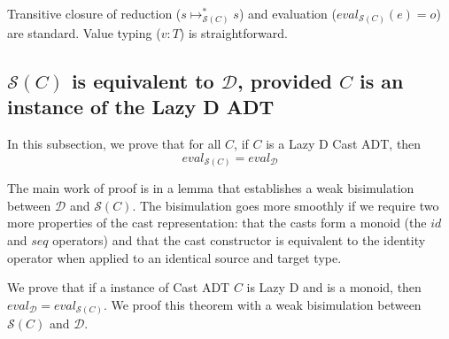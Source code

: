 \documentclass[acmsmall,review,anonymous]{acmart}\settopmatter{printfolios=true,printccs=false,printacmref=false}
\newcommand{\judgeType}[2]{#1 : #2}
\newcommand{\hckOOconsI}[3]{\mathtt{cons_1}\;#1\;#2\;#3}
\newcommand{\judgeSreduceTrans}[3]{#2 \longmapsto_{\mathcal{S}(#1)}^{*} #3}
\newcommand{\judgeSeval}[3]{eval_{\mathcal{S}(#1)}(#2) = #3}
\newcommand{\ineffCEKD}{$\mathcal{D}$}
\newcommand{\effCEK}[1]{$\mathcal{S}(#1)$}
\newcommand{\evalEqv}[2]{\ensuremath{eval_{\text{#1}} = eval_{\text{#2}}}}
\begin{document}

Transitive closure of reduction ($\judgeSreduceTrans{C}{s}{s}$) and 
evaluation ($\judgeSeval{C}{e}{o}$) are standard. Value typing 
($\judgeType{v}{T}$) is straightforward.

\subsection{\effCEK{C} is equivalent to \ineffCEKD, provided $C$ is an instance of the Lazy D ADT}
\label{secc:framework:monoid-correct}

In this subsection, we prove that for all $C$, if $C$ is a Lazy D Cast
ADT, then
\[
  \evalEqv{\effCEK{C}}{\ineffCEKD}
\]

The main work of proof is in a lemma that establishes a weak
bisimulation between \ineffCEKD{} and \effCEK{C}.  The bisimulation
goes more smoothly if we require two more properties of the cast
representation: that the casts form a monoid (the $id$ and $seq$
operators) and that the cast constructor is equivalent to the identity
operator when applied to an identical source and target type.







We prove that if a instance of Cast ADT $C$ is
Lazy D and is a monoid, then $eval_\mathcal{D} =
eval_{\mathcal{S}(C)}$. We proof this theorem with a weak bisimulation
between \effCEK{C} and \ineffCEKD.
\end{document}
